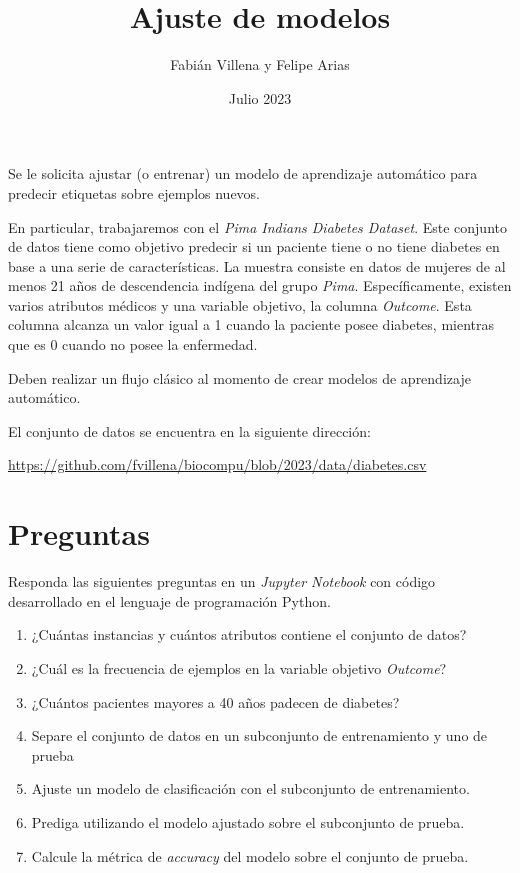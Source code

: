 \documentclass{article}
\title{Ajuste de modelos}
\author{Fabián Villena y Felipe Arias}
\date{Julio 2023}
\begin{document}
\maketitle

Se le solicita ajustar (o entrenar) un modelo de aprendizaje automático para predecir etiquetas sobre ejemplos nuevos.

En particular, trabajaremos con el \textit{Pima Indians Diabetes Dataset}. Este conjunto de datos tiene como objetivo predecir si un paciente tiene o no tiene diabetes en base a una serie de características. La muestra consiste en datos de mujeres de al menos 21 años de descendencia indígena del grupo \textit{Pima}. Específicamente, existen varios atributos médicos y una variable objetivo, la columna \textit{Outcome}. Esta columna alcanza un valor igual a 1 cuando la paciente posee diabetes, mientras que es 0 cuando no posee la enfermedad.

Deben realizar un flujo clásico al momento de crear modelos de aprendizaje automático.

El conjunto de datos se encuentra en la siguiente dirección:

\begin{center}
    \url{https://github.com/fvillena/biocompu/blob/2023/data/diabetes.csv}
\end{center}

\section*{Preguntas}

Responda las siguientes preguntas en un \textit{Jupyter Notebook} con código desarrollado en el lenguaje de programación Python.

\begin{enumerate}
	\item ¿Cuántas instancias y cuántos atributos contiene el conjunto de datos?
    \item ¿Cuál es la frecuencia de ejemplos en la variable objetivo \textit{Outcome}?
    \item ¿Cuántos pacientes mayores a 40 años padecen de diabetes?
    \item Separe el conjunto de datos en un subconjunto de entrenamiento y uno de prueba
    \item Ajuste un modelo de clasificación con el subconjunto de entrenamiento.
    \item Prediga utilizando el modelo ajustado sobre el subconjunto de prueba.
    \item Calcule la métrica de \textit{accuracy} del modelo sobre el conjunto de prueba.
\end{enumerate}
\end{document}
